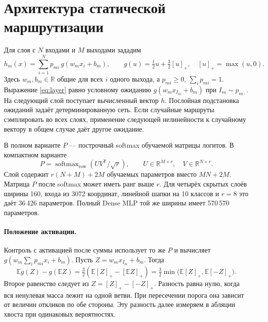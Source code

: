 \documentclass[11pt,a4paper]{article}
\newcommand{\relu}[1]{\left[#1\right]_+}
\newcommand{\E}{\mathbb{E}}
\begin{document}
\section{Архитектура статической маршрутизации}
\label{sec:architecture}
Для слоя с $N$ входами и $M$ выходами зададим
\begin{equation}
 h_m(x)=\sum_{i=1}^N p_{mi}\,g(w_m x_i+b_m),
 \qquad
 g(u)=\tfrac12u+\tfrac32\relu{u},
 \quad \relu{u}=\max(u,0).
 \label{eq:layer}
\end{equation}
Здесь $w_m,b_m\in\mathbb R$ общие для всех $i$ одного выхода, а $p_{mi}\ge 0$, $\sum_i p_{mi}=1$. Выражение \eqref{eq:layer} равно условному ожиданию $g(w_m x_{I_m}+b_m)$ при $I_m\sim p_{m\cdot}$. На следующий слой поступает вычисленный вектор $h$. Послойная подстановка ожиданий задаёт детерминированную сеть. Если случайные маршруты сэмплировать во всех слоях, применение следующей нелинейности к случайному вектору в общем случае даёт другое ожидание.

В полном варианте $P$ — построчный softmax обучаемой матрицы логитов. В компактном варианте
\begin{equation}
 P=\operatorname{softmax}_{\mathrm{row}}(UV^\mathsf{T}/\sqrt r),
 \qquad U\in\mathbb R^{M\times r},\quad V\in\mathbb R^{N\times r}.
 \label{eq:factor}
\end{equation}
Слой содержит $r(N+M)+2M$ обучаемых параметров вместо $MN+2M$. Матрица $P$ после softmax может иметь ранг выше $r$. Для четырёх скрытых слоёв ширины 160, входа из 3072 координат, линейной шапки на 10 классов и $r=8$ это даёт 36\,426 параметров. Полный Dense MLP той же ширины имеет 570\,570 параметров.

\paragraph{Положение активации.} Контроль с активацией после суммы использует то же $P$ и вычисляет $g(w_m\sum_i p_{mi}x_i+b_m)$. Пусть $Z=w_m x_{I_m}+b_m$. Тогда
\begin{equation}
 \E g(Z)-g(\E Z)
 =\tfrac32\left(\E\relu Z-\relu{\E Z}\right)
 =\tfrac32\min\bigl(\E\relu Z,\E\relu{-Z}\bigr).
 \label{eq:jensen}
\end{equation}
Второе равенство следует из $Z=\relu Z-\relu{-Z}$. Разность равна нулю, когда вся ненулевая масса лежит на одной ветви. При пересечении порога она зависит от величин откликов по обе стороны. Эту разность далее измеряем в абляции хвоста при одинаковых вероятностях.
\end{document}
